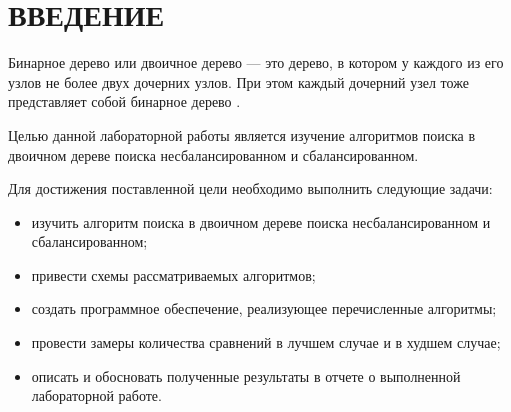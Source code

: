 \chapter*{\hfill{\centering ВВЕДЕНИЕ}\hfill}

Бинарное дерево или двоичное дерево --- это дерево, в котором у каждого из его узлов не более двух дочерних узлов.
При этом каждый дочерний узел тоже представляет собой бинарное дерево \cite{bib0}. 

Целью данной лабораторной работы является изучение алгоритмов поиска в двоичном дереве поиска несбалансированном и сбалансированном.

Для достижения поставленной цели необходимо выполнить следующие задачи:

\begin{itemize}[label=---]
	\item изучить алгоритм поиска в двоичном дереве поиска несбалансированном и сбалансированном;
	\item привести схемы рассматриваемых алгоритмов;
	\item создать программное обеспечение, реализующее перечисленные алгоритмы;
	\item провести замеры количества сравнений в лучшем случае и в худшем случае;
	\item описать и обосновать полученные результаты в отчете о выполненной лабораторной работе.
\end{itemize}
